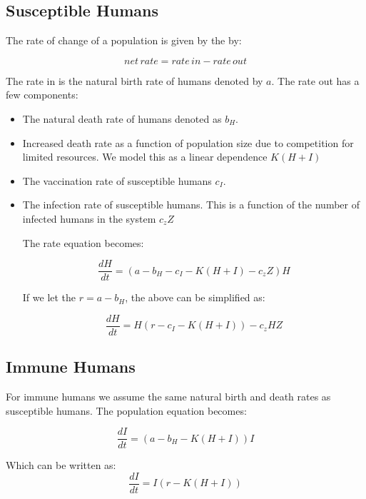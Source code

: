 \documentclass[
	12pt
]{article}
\begin{document}
\subsection{Susceptible Humans}


The rate of change of a population is given by the by:

\begin{equation}
net \, rate = rate \, in - rate \, out
\end{equation}

The rate in is the natural birth rate of humans denoted by $a$. The rate out has a few components:

\begin{itemize}
\item The natural death rate of humans denoted as $b_H$.
\item Increased death rate as a function of population size due to competition for limited resources. We model this as a linear dependence $K(H+I)$
\item The vaccination rate of susceptible humans $c_I$.
\item The infection rate of susceptible humans. This is a function of the number of infected humans in the system $c_zZ$

The rate equation becomes:

\begin{equation}
\frac{dH}{dt} = (a-b_H-c_I-K(H+I)-c_zZ)H
\end{equation}

If we let the $r = a-b_H$, the above can be simplified as:

\begin{equation}
\frac{dH}{dt} = H(r - c_I-K(H+I))-c_zHZ
\end{equation}
\end{itemize}

\subsection{Immune Humans}

For immune humans we assume the same natural birth and death rates as susceptible humans. The population equation becomes:

\begin{equation}
\frac{dI}{dt} = (a-b_H-K(H+I))I
\end{equation}

Which can be written as:
\begin{equation}
\frac{dI}{dt} = I(r-K(H+I))
\end{equation}
\end{document}
